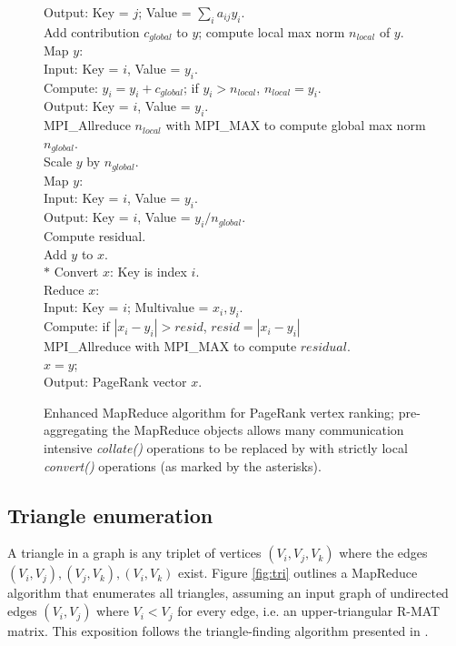 \begin{figure}[htb]
\begin{center}
{\begin{minipage}{\textwidth}
\begin{tabbing}
\> \> \> Output:  Key = $j$; Value = $\sum_i a_{ij} y_i$. \\
\> Add contribution $c_{global}$ to $y$; compute local max norm $n_{local}$ of $y$. \\
\> \> Map $y$:  \\
\> \> \> Input:  Key = $i$, Value = $y_i$. \\
\> \> \> Compute: $y_i = y_i + c_{global}$; if $y_i > {n_{local}}$, $n_{local} = y_i$. \\
\> \> \> Output:  Key = $i$, Value = $y_i$. \\
\> \> MPI\_Allreduce $n_{local}$ with MPI\_MAX to compute global max norm $n_{global}$. \\
\> Scale $y$ by $n_{global}$. \\
\> \> Map $y$: \\
\> \> \> Input:  Key = $i$, Value = $y_i$. \\
\> \> \> Output:  Key = $i$, Value = $y_i / {n_{global}}$. \\
\> Compute residual. \\
\> \> Add $y$ to $x$. \\
$*$\> \> Convert $x$:  Key is index $i$. \\
\> \> Reduce $x$:   \\
\> \> \> Input:  Key = $i$; Multivalue = $x_i, y_i$. \\
\> \> \> Compute:  if $|x_i - y_i| > {resid}$, ${resid} = |x_i - y_i|$ \\
\> \> MPI\_Allreduce with MPI\_MAX to compute $residual$. \\
\> $x = y$; \\
Output:  PageRank vector $x$.
  \end{tabbing}
 \end{minipage}}\end{center}

 \caption{Enhanced MapReduce algorithm for PageRank vertex ranking; pre-aggregating the MapReduce objects allows many communication intensive {\it collate()} 
operations to be replaced by with strictly local {\it convert()} operations (as marked by the asterisks).}

 \label{fig:pr2}
\end{figure}


\subsection{Triangle enumeration}

A triangle in a graph is any triplet of vertices $(V_i,V_j,V_k)$ where
the edges $(V_i,V_j), (V_j,V_k), (V_i,V_k)$ exist.  Figure
\ref{fig:tri} outlines a MapReduce algorithm that enumerates all
triangles, assuming an input graph of undirected edges $(V_i,V_j)$
where $V_i < V_j$ for every edge, i.e. an upper-triangular R-MAT
matrix.  This exposition follows the triangle-finding algorithm
presented in \cite{Cohen}.

